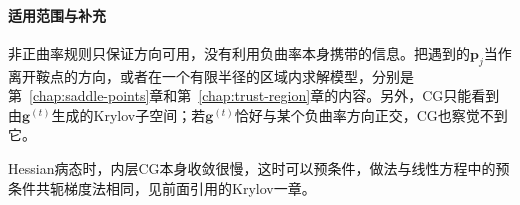 \paragraph{适用范围与补充}
非正曲率规则只保证方向可用，没有利用负曲率本身携带的信息。把遇到的$\bm{p}_j$当作离开鞍点的方向，或者在一个有限半径的区域内求解模型，分别是第~\ref{chap:saddle-points}章和第~\ref{chap:trust-region}章的内容。另外，CG只能看到由$\bm{g}^{(t)}$生成的Krylov子空间；若$\bm{g}^{(t)}$恰好与某个负曲率方向正交，CG也察觉不到它。

Hessian病态时，内层CG本身收敛很慢，这时可以预条件，做法与线性方程中的预条件共轭梯度法相同，见前面引用的Krylov一章。
